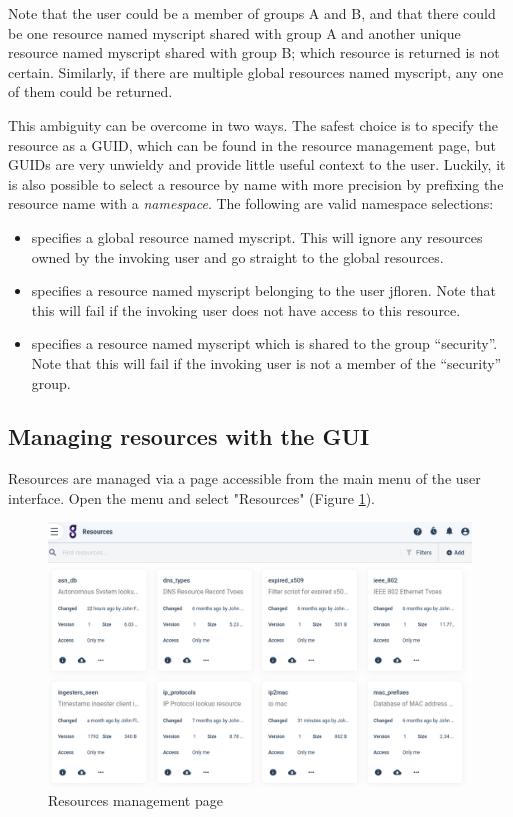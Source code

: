 Note that the user could be a member of groups A and B, and that there
could be one resource named myscript shared with group A and another
unique resource named myscript shared with group B; which resource
is returned is not certain. Similarly, if there are multiple global
resources named myscript, any one of them could be returned.

This ambiguity can be overcome in two ways. The safest choice is to
specify the resource as a GUID, which can be found in the resource
management page, but GUIDs are very unwieldy and provide little useful
context to the user. Luckily, it is also possible to select a resource
by name with more precision by prefixing the resource name with a
\emph{namespace}. The following are valid namespace selections:

\begin{itemize}
\item
   specifies a global resource named myscript.
  This will ignore any resources owned by the invoking user and go
  straight to the global resources.
\item
   specifies a resource named
  myscript belonging to the user jfloren. Note that this will
  fail if the invoking user does not have access to this resource.
\item
   specifies a resource named
  myscript which is shared to the group ``security''. Note that this
  will fail if the invoking user is not a member of the
  ``security'' group.
\end{itemize}

\subsection{Managing resources with the GUI}

Resources are managed via a page accessible from the main menu of the user interface. Open the
menu and select "Resources" (Figure \ref{fig:resource-page}).

\begin{figure}
	\includegraphics[width=0.7\linewidth]{images/resource-page.png}
	\caption{Resources management page}
	\label{fig:resource-page}
\end{figure}

